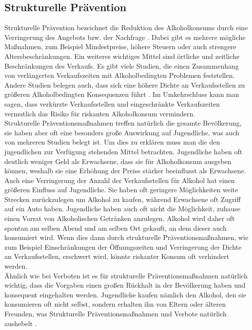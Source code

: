 \documentclass[12pt]{article}
\begin{document}
\subsection{Strukturelle Prävention}
Strukturelle Prävention bezeichnet die Reduktion des Alkoholkonsums durch eine Verringerung des Angebots bzw. der Nachfrage \autocite[169]{skala_jugend_2020}. Dabei gibt es mehrere mögliche Maßnahmen, zum Beispiel Mindestpreise, höhere Steuern oder auch strengere Altersbeschränkungen. Ein weiteres wichtiges Mittel sind örtliche und zeitliche Beschränkungen des Verkaufs. Es gibt viele Studien, die einen Zusammenhang von verlängerten Verkaufszeiten mit Alkoholbedingten Problemen feststellen. Andere Studien belegen auch, dass sich eine höhere Dichte an Verkaufsstellen zu größeren Alkoholbedingten Konsequenzen führt \autocite[26]{hagen_verkaufseinschrankungen_2011}. Im Umkehrschluss kann man sagen, dass verkürzte Verkaufsstellen und eingeschränkte Verkaufszeiten vermutlich das Risiko für riskanten Alkoholkonsum vermindern.\\
Strukturelle Präventionsmaßnahmen treffen natürlich die gesamte Bevölkerung, sie haben aber oft eine besonders große Auswirkung auf Jugendliche, was auch von mehreren Studien belegt ist. Um dies zu erklären muss man die den jugendlichen zur Verfügung stehenden Mittel betrachten. Jugendliche haben oft deutlich weniger Geld als Erwachsene, dass sie für Alkoholkonsum ausgeben können, weshalb sie eine Erhöhung der Preise stärker beeinflusst als Erwachsene. Auch eine Verringerung der Anzahl der Verkaufsstellen für Alkohol hat einen größeren Einfluss auf Jugendliche. Sie haben oft geringere Möglichkeiten weite Strecken zurückzulegen um Alkohol zu kaufen, während Erwachsene oft Zugriff auf ein Auto haben. Jugendliche haben auch oft nicht die Möglichkeit, zuhause einen Vorrat von Alkoholischen Getränken anzulegen. Alkohol wird daher oft spontan am selben Abend und am selben Ort gekauft, an dem dieser auch konsumiert wird. Wenn dies dann durch strukturelle Präventionsmaßnahmen, wie zum Beispiel Einschränkungen der Öffnungszeiten und Verringerung der Dichte an Verkaufsstellen, erschwert wird, könnte riskanter Konsum oft verhindert werden.\\
Ähnlich wie bei Verboten ist es für strukturelle Präventionsmaßnahmen natürlich wichtig, dass die Vorgaben einen großen Rückhalt in der Bevölkerung haben und konsequent eingehalten werden. Jugendliche kaufen nämlich den Alkohol, den sie konsumieren oft nicht selbst, sondern erhalten ihn von Eltern oder älteren Freunden, was Strukturelle Präventionsmaßnahmen und Verbote natürlich aushebelt \autocite[169]{skala_jugend_2020}.\\
\end{document}
